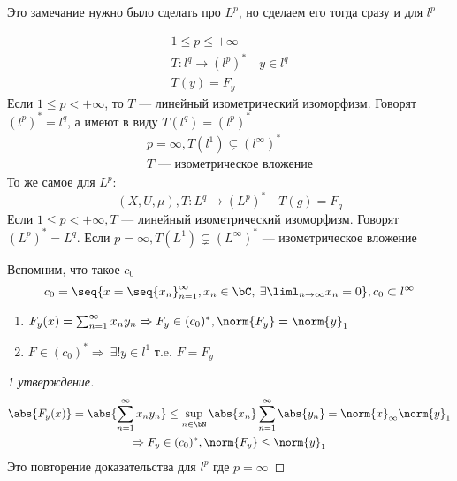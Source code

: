 \documentclass[document]{subfiles}
\begin{document}
Это замечание нужно было сделать про $L^p$, но сделаем  его тогда сразу и для $l^p$
\begin{remark}
    \begin{gather*}
        1 \leq p \leq +\infty \\
        T: l^q \rightarrow (l^p)^* \quad y \in l^q \\
        T(y) = F_y
    \end{gather*}
    Если $1 \leq p < + \infty$, то $T$ --- линейный изометрический изоморфизм. Говорят $(l^p)^* = l^q$, а имеют в виду $T(l^q) = (l^p)^*$
    \begin{gather*}
        p = \infty, T(l^1) \subsetneq (l^\infty)^* \\
        T \text{ --- изометрическое вложение}
    \end{gather*}
    То же самое для $L^p$:
        \[ (X, U, \mu), T: L^q \rightarrow (L^p)^* \quad T(g) = F_g \]
        Если $1 \leq p < +\infty, T$ --- линейный изометрический изоморфизм. Говорят $(L^p)^* = L^q$. Если $p = \infty, T(L^1) \subsetneq (L^\infty)^*$ --- 
        изометрическое вложение
\end{remark}

Вспомним, что такое $c_0$
\[ c_0 = \seq{ x = \seq{x_n}^\infty_{n=1}, x_n \in \bC, \: \exists \liml_{n \to \infty} x_n = 0}, c_0 \subset l^\infty \]

\begin{theorem}[сопряжённое к $c_0$]
    \begin{enumerate}
        \item $F_y(x) = \sum^\infty_{n=1} x_n y_n \Rightarrow F_y \in (c_0)^*, \norm{F_y} = \norm{y}_1$
        \item $F \in (c_0)^* \Rightarrow \: \exists! y \in l^1 \text{ т.e. } F = F_y $
    \end{enumerate}
\end{theorem}

\begin{proof}[1 утверждение]
    \begin{gather*}
        \abs{F_y(x)} = \abs{\sum^\infty_{n=1} x_n y_n} \leq \sup_{n \in \bN} \abs{x_n} \sum^\infty_{n=1} \abs{y_n} = \norm{x}_\infty \norm{y}_1 \\
        \Rightarrow F_y \in (c_0)^*,  \norm{F_y} \leq \norm{y}_1
    \end{gather*}
    Это повторение доказательства для $l^p$ где $p=\infty$
\end{proof}
\end{document}
